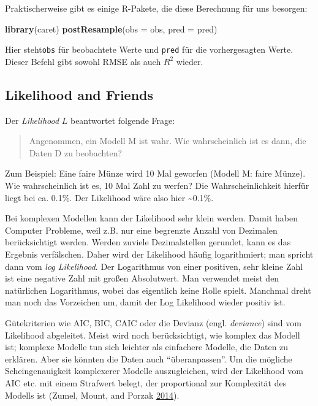 \documentclass[12pt,]{book}
\makeatletter
\newenvironment{Shaded}{\begin{snugshade}}{\end{snugshade}}
\newcommand{\KeywordTok}[1]{\textcolor[rgb]{0.13,0.29,0.53}{\textbf{{#1}}}}
\newcommand{\DataTypeTok}[1]{\textcolor[rgb]{0.13,0.29,0.53}{{#1}}}
\newcommand{\NormalTok}[1]{{#1}}
\newenvironment{kframe}{%
\medskip{}
\setlength{\fboxsep}{.8em}
 \def\at@end@of@kframe{}%
 \ifinner\ifhmode%
  \def\at@end@of@kframe{\end{minipage}}%
  \begin{minipage}{\columnwidth}%
 \fi\fi%
 \def\FrameCommand##1{\hskip\@totalleftmargin \hskip-\fboxsep
 \colorbox{shadecolor}{##1}\hskip-\fboxsep
     \hskip-\linewidth \hskip-\@totalleftmargin \hskip\columnwidth}%
 \MakeFramed {\advance\hsize-\width
   \@totalleftmargin\z@ \linewidth\hsize
   \@setminipage}}%
 {\par\unskip\endMakeFramed%
 \at@end@of@kframe}
\renewenvironment{Shaded}{\begin{kframe}}{\end{kframe}}
\makeatother
\begin{document}
Praktischerweise gibt es einige R-Pakete, die diese Berechnung für uns
besorgen:

\begin{Shaded}
\begin{Highlighting}[]
\KeywordTok{library}\NormalTok{(caret)}
\KeywordTok{postResample}\NormalTok{(}\DataTypeTok{obs =} \NormalTok{obs, }\DataTypeTok{pred =} \NormalTok{pred)}
\end{Highlighting}
\end{Shaded}

Hier steht\texttt{obs} für beobachtete Werte und \texttt{pred} für die
vorhergesagten Werte. Dieser Befehl gibt sowohl RMSE als auch \(R^2\)
wieder.

\subsection{Likelihood and Friends}\label{likelihood-and-friends}

Der \emph{Likelihood} \(L\) beantwortet folgende Frage:

\begin{quote}
Angenommen, ein Modell M ist wahr. Wie wahrscheinlich ist es dann, die
Daten D zu beobachten?
\end{quote}

Zum Beispiel: Eine faire Münze wird 10 Mal geworfen (Modell M: faire
Münze). Wie wahrscheinlich ist es, 10 Mal Zahl zu werfen? Die
Wahrscheinlichkeit hierfür liegt bei ca. 0.1\%. Der Likelihood wäre also
hier \textasciitilde{}0.1\%.

Bei komplexen Modellen kann der Likelihood sehr klein werden. Damit
haben Computer Probleme, weil z.B. nur eine begrenzte Anzahl von
Dezimalen berücksichtigt werden. Werden zuviele Dezimalstellen gerundet,
kann es das Ergebnis verfälschen. Daher wird der Likelihood häufig
logarithmiert; man spricht dann vom \emph{log Likelihood}. Der
Logarithmus von einer positiven, sehr kleine Zahl ist eine negative Zahl
mit großen Absolutwert. Man verwendet meist den natürlichen Logarithmus,
wobei das eigentlich keine Rolle spielt. Manchmal dreht man noch das
Vorzeichen um, damit der Log Likelihood wieder positiv ist.

Gütekriterien wie AIC, BIC, CAIC oder die Devianz (engl.
\emph{deviance}) sind vom Likelihood abgeleitet. Meist wird noch
berücksichtigt, wie komplex das Modell ist; komplexe Modelle tun sich
leichter als einfachere Modelle, die Daten zu erklären. Aber sie könnten
die Daten auch ``überanpassen''. Um die mögliche Scheingenauigkeit
komplexerer Modelle auszugleichen, wird der Likelihood vom AIC etc. mit
einem Strafwert belegt, der proportional zur Komplexität des Modells ist
(Zumel, Mount, and Porzak
\protect\hyperlink{ref-zumel2014practical}{2014}).
\end{document}
